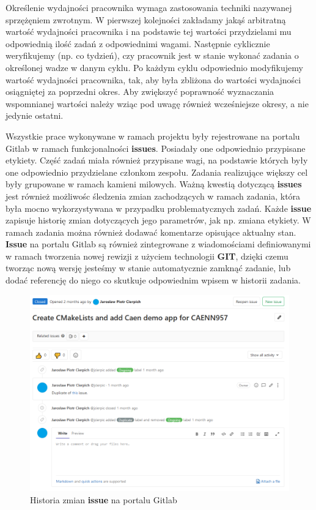 Określenie wydajności pracownika wymaga zastosowania techniki nazywanej sprzężęniem zwrotnym. W pierwszej kolejności zakładamy jakąś arbitratną wartość wydajności pracownika i na podstawie tej wartości przydzielami mu odpowiednią ilość zadań z odpowiednimi wagami. Następnie cyklicznie weryfikujemy (np. co tydzień), czy pracownik jest w stanie wykonać zadania o określonej wadze w danym cyklu. Po każdym cyklu odpowiednio modyfikujemy wartość wydajności pracownika, tak, aby była zbliżona do wartości wydajności osiągniętej za poprzedni okres. Aby zwiększyć poprawność wyznaczania wspomnianej wartości należy wziąc pod uwagę również wcześniejsze okresy, a nie jedynie ostatni.\par

Wszystkie prace wykonywane w ramach projektu były rejestrowane na portalu Gitlab w ramach funkcjonalności \textbf{issues}. Posiadały one odpowiednio przypisane etykiety. Część zadań miała również przypisane wagi, na podstawie których były one odpowiednio przydzielane członkom zespołu. Zadania realizujące większy cel były grupowane w ramach kamieni milowych. Ważną kwestią dotyczącą \textbf{issues} jest również możliwośc śledzenia zmian zachodzących w ramach zadania, która była mocno wykorzystywana w przypadku problematycznych zadań. Każde \textbf{issue} zapisuje historię zmian dotyczących jego parametrów, jak np. zmiana etykiety. W ramach zadania można również dodawać komentarze opisujące aktualny stan. \textbf{Issue} na portalu Gitlab są również zintegrowane z wiadomościami definiowanymi w ramach tworzenia nowej rewizji z użyciem technologii \textbf{GIT}, dzięki czemu tworząc nową wersję jesteśmy w stanie automatycznie zamknąć zadanie, lub dodać referencję do niego co skutkuje odpowiednim wpisem w historii zadania.

\begin{figure}[H]
\centering
\caption{Historia zmian \textbf{issue} na portalu Gitlab}
\label{fig:kanban}
\includegraphics[width=\textwidth]{res/png/issueOngoing}
\end{figure}

